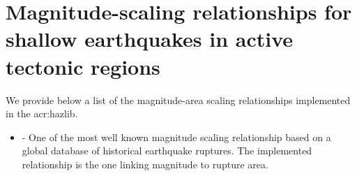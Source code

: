 \label{sec:msr_list}

\section{Magnitude-scaling relationships for shallow earthquakes 
    in active tectonic regions}
We provide below a list of the magnitude-area scaling relationships 
implemented in the \gls{acr:hazlib}. 
\begin{itemize} 
    \item \cite{wells1994} - One of the most well known magnitude scaling
        relationship based on a global database of historical earthquake 
        ruptures. The implemented relationship is the one linking magnitude 
        to rupture area.
\end{itemize}
%
%
